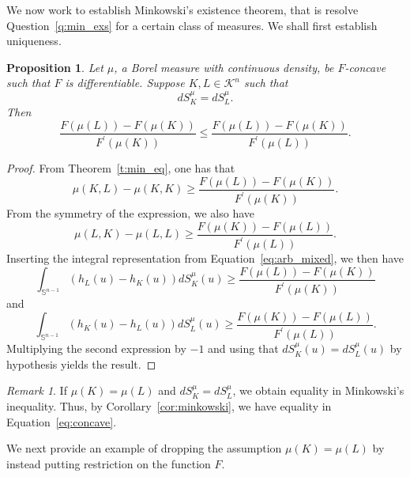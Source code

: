 \documentclass[11pt]{amsart}
\newtheorem{proposition}[theorem]{Proposition}
\theoremstyle{definition}
\theoremstyle{remark}
\newtheorem{remark}[theorem]{Remark}
\numberwithin{equation}{section}
\newcommand{\s}{\mathbb{S}}
\newcommand{\conbod}{\mathcal{K}^n}
\begin{document}


We now work to establish Minkowski's existence theorem, that is resolve Question~\ref{q:min_exs} for a certain class of measures. We shall first establish uniqueness.
\begin{proposition}
\label{p:uni_0}
Let $\mu$, a Borel measure with continuous density, be $F$-concave such that $F$ is differentiable. Suppose $K,L\in\conbod$ such that $$dS^{\mu}_{K}=dS^{\mu}_{L}.$$ Then
$$\frac{F(\mu(L))-F(\mu(K))}{F^{\prime}(\mu(K))}\leq \frac{F(\mu(L))-F(\mu(K))}{F^{\prime}(\mu(L))}.$$
\end{proposition}
\begin{proof}
From Theorem~\ref{t:min_eq}, one has that 
$$
\mu(K, L) - \mu(K, K)\geq \frac{F(\mu(L))-F(\mu(K))}{F^{\prime}(\mu(K))}.
$$
From the symmetry of the expression, we also have
$$
\mu(L, K) - \mu(L, L) \geq \frac{F(\mu(K))-F(\mu(L))}{F^{\prime}(\mu(L))}.
$$
Inserting the integral representation from Equation~\ref{eq:arb_mixed}, we then have
$$\int_{\s^{n-1}}(h_L(u)-h_K(u))dS^{\mu}_{K}(u)\geq \frac{F(\mu(L))-F(\mu(K))}{F^{\prime}(\mu(K))}$$
and
$$
\int_{\s^{n-1}}(h_K(u)-h_L(u))dS^{\mu}_{L}(u) \geq \frac{F(\mu(K))-F(\mu(L))}{F^{\prime}(\mu(L))}.
$$
Multiplying the second expression by $-1$ and using that $dS^{\mu}_{K}(u)=dS^{\mu}_{L}(u)$ by hypothesis yields the result.
\end{proof}
\begin{remark}
\label{r:uni_1}
If $\mu(K)=\mu(L)$ and $dS^{\mu}_{K}=dS^{\mu}_{L}$, we obtain equality in Minkowski's inequality. Thus, by Corollary~\ref{cor:minkowski}, we have equality in Equation~\ref{eq:concave}.
\end{remark}
We next provide an example of dropping the assumption $\mu(K)=\mu(L)$ by instead putting restriction on the function $F$.
\end{document}
